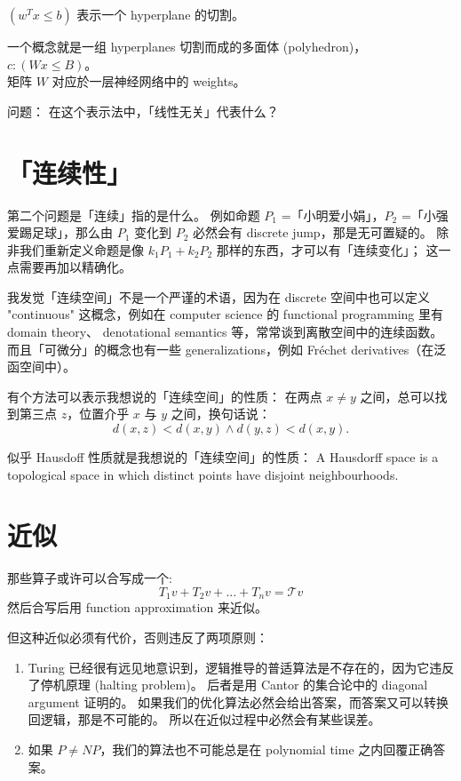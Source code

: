 \documentclass[12pt]{article}
\newcommand{\tab}{\hspace*{1cm}}
\begin{document}
$ (w^T x \leq b) $ 表示一个 hyperplane 的切割。

一个概念就是一组 hyperplanes 切割而成的多面体 (polyhedron)，\\
\tab \tab $c : (Wx \leq B) $。\\
矩阵 $W$ 对应於一层神经网络中的 weights。

问题： 在这个表示法中，「线性无关」代表什么？

\section{「连续性」}

第二个问题是「连续」指的是什么。 例如命题 $P_1$ =「小明爱小娟」，$P_2$ =「小强爱踢足球」，那么由 $P_1$ 变化到 $P_2$ 必然会有 discrete jump，那是无可置疑的。 除非我们重新定义命题是像 $k_1 P_1+ k_2 P_2$ 那样的东西，才可以有「连续变化」；  这一点需要再加以精确化。

我发觉「连续空间」不是一个严谨的术语，因为在 discrete 空间中也可以定义 "continuous" 这概念，例如在 computer science 的 functional programming 里有 domain theory、 denotational semantics 等，常常谈到离散空间中的连续函数。 而且「可微分」的概念也有一些 generalizations，例如 Fr\'{e}chet derivatives（在泛函空间中）。

有个方法可以表示我想说的「连续空间」的性质： 在两点 $x \neq y$ 之间，总可以找到第三点 $z$，位置介乎 $x$ 与 $y$ 之间，换句话说：
$$ d(x,z) < d(x,y) \wedge d(y,z) < d(x,y). $$

似乎 Hausdoff 性质就是我想说的「连续空间」的性质： A Hausdorff space is a topological space in which distinct points have disjoint neighbourhoods.  

\section{近似}

那些算子或许可以合写成一个:
$$ T_1 v + T_2 v + ... + T_n v = \mathcal{T} v $$
然后合写后用 function approximation 来近似。

但这种近似必须有代价，否则违反了两项原则：
\begin{enumerate}
\item Turing 已经很有远见地意识到，逻辑推导的普适算法是不存在的，因为它违反了停机原理 (halting problem)。 后者是用 Cantor 的集合论中的 diagonal argument 证明的。 如果我们的优化算法必然会给出答案，而答案又可以转换回逻辑，那是不可能的。 所以在近似过程中必然会有某些误差。
\item 如果 $P \neq NP$，我们的算法也不可能总是在 polynomial time 之内回覆正确答案。
\end{enumerate}
\end{document}
